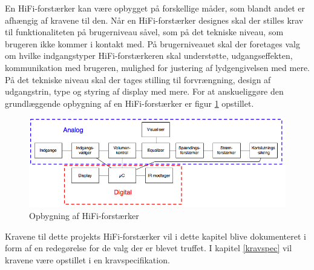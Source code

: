 En HiFi-forstærker kan være opbygget på forskellige måder, som blandt andet er afhængig af kravene til den. Når en HiFi-forstærker designes skal der stilles krav til funktionaliteten på brugerniveau såvel, som på det tekniske niveau, som brugeren ikke kommer i kontakt med. 
På brugerniveauet skal der foretages valg om hvilke indgangstyper HiFi-forstærkeren skal understøtte, udgangseffekten, kommunikation med brugeren, mulighed for justering af lydgengivelsen med mere. På det tekniske niveau skal der tages stilling til forvrængning, design af udgangstrin, type og styring af display med mere. 
For at anskueliggøre den grundlæggende opbygning af en HiFi-forstærker er figur \ref{fig:forstaerker_opbygning} opstillet.

\begin{figure}[h]
\centering
\includegraphics[scale=.6]{indledende_analyse/generel_effektforstaerker/forstaerker_opbygning.png}
\caption{Opbygning af HiFi-forstærker}
\label{fig:forstaerker_opbygning}
\end{figure}

Kravene til dette projekts HiFi-forstærker vil i dette kapitel blive dokumenteret i form af en redegørelse for de valg der er blevet truffet. I kapitel \ref{kravspec} vil kravene være opstillet i en kravspecifikation.